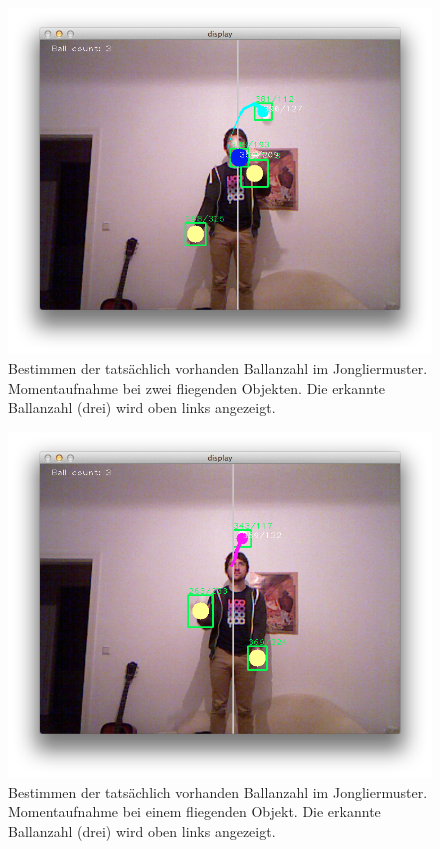\documentclass[12pt,a4paper,ngerman]{scrartcl}
\begin{document}
\begin{figure}[H]
    \centering
    \includegraphics[scale=0.5]{img/ballcount-1.png}
    \vspace{-0.5cm}
    \caption{Bestimmen der tatsächlich vorhanden Ballanzahl im Jongliermuster. Momentaufnahme bei zwei fliegenden Objekten. Die erkannte Ballanzahl (drei) wird oben links angezeigt.}
    \label{ballcount-1}
\end{figure}

\begin{figure}[H]
    \centering
    \includegraphics[scale=0.5]{img/ballcount-2.png}
    \vspace{-0.5cm}
    \caption{Bestimmen der tatsächlich vorhanden Ballanzahl im Jongliermuster. Momentaufnahme bei einem fliegenden Objekt. Die erkannte Ballanzahl (drei) wird oben links angezeigt.}
    \label{ballcount-2}
\end{figure}
\end{document}
